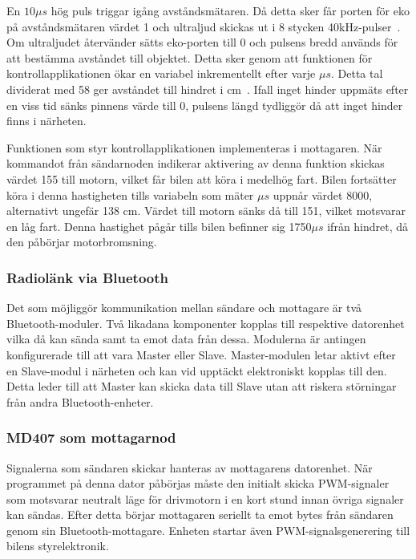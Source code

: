 \documentclass[a4paper]{article}
\begin{document}
\vspace{5mm} \noindent
En $10\mu s$ hög puls triggar igång avståndsmätaren. Då detta sker får porten för eko på avståndsmätaren värdet 1 och ultraljud skickas ut i 8 stycken 40kHz-pulser~\cite{DistMeasure}. Om ultraljudet återvänder sätts eko-porten till 0 och pulsens bredd används för att bestämma avståndet till objektet. Detta sker genom att funktionen för kontrollapplikationen ökar en variabel inkrementellt efter varje $\mu s$. Detta tal dividerat med 58 ger avståndet till hindret i cm~\cite{DistMeasure}. Ifall inget hinder uppmäts efter en viss tid sänks pinnens värde till 0, pulsens längd tydliggör då att inget hinder finns i närheten.


\newpage
\noindent
Funktionen som styr kontrollapplikationen implementeras i mottagaren. När kommandot från sändarnoden indikerar aktivering av denna funktion skickas värdet 155 till motorn, vilket får bilen att köra i medelhög fart. Bilen fortsätter köra i denna hastigheten tills variabeln som mäter $\mu s$ uppnår värdet 8000, alternativt ungefär 138 cm. Värdet till motorn sänks då till 151, vilket motsvarar en låg fart. Denna hastighet pågår tills bilen befinner sig 1750$\mu s$ ifrån hindret, då den påbörjar motorbromsning.


\subsubsection{Radiolänk via Bluetooth}
Det som möjliggör kommunikation mellan sändare och mottagare är två Bluetooth-moduler. Två likadana komponenter kopplas till respektive datorenhet vilka då kan sända samt ta emot data från dessa. Modulerna är antingen konfigurerade till att vara Master eller Slave. Master-modulen letar aktivt efter en Slave-modul i närheten och kan vid upptäckt elektroniskt kopplas till den. Detta leder till att Master kan skicka data till Slave utan att riskera störningar från andra Bluetooth-enheter.


\subsubsection{MD407 som mottagarnod}
Signalerna som sändaren skickar hanteras av mottagarens datorenhet. När programmet på denna dator påbörjas måste den initialt skicka PWM-signaler som motsvarar neutralt läge för drivmotorn i en kort stund innan övriga signaler kan sändas. Efter detta börjar mottagaren seriellt ta emot bytes från sändaren genom sin Bluetooth-mottagare. Enheten startar även PWM-signalsgenerering till bilens styrelektronik.
\end{document}
